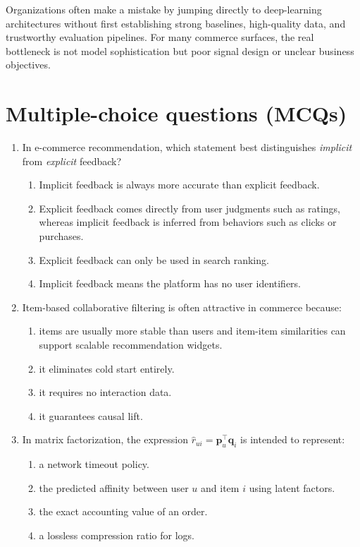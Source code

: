 Organizations often make a mistake by jumping directly to deep-learning architectures without first establishing strong baselines, high-quality data, and trustworthy evaluation pipelines.
For many commerce surfaces, the real bottleneck is not model sophistication but poor signal design or unclear business objectives.

\section{Multiple-choice questions (MCQs)}
\begin{enumerate}
  \item In e-commerce recommendation, which statement best distinguishes \emph{implicit} from \emph{explicit} feedback?
  \begin{enumerate}
    \item Implicit feedback is always more accurate than explicit feedback.
    \item Explicit feedback comes directly from user judgments such as ratings, whereas implicit feedback is inferred from behaviors such as clicks or purchases.
    \item Explicit feedback can only be used in search ranking.
    \item Implicit feedback means the platform has no user identifiers.
  \end{enumerate}

  \item Item-based collaborative filtering is often attractive in commerce because:
  \begin{enumerate}
    \item items are usually more stable than users and item-item similarities can support scalable recommendation widgets.
    \item it eliminates cold start entirely.
    \item it requires no interaction data.
    \item it guarantees causal lift.
  \end{enumerate}

  \item In matrix factorization, the expression $\hat{r}_{ui}=\mathbf{p}_u^\top \mathbf{q}_i$ is intended to represent:
  \begin{enumerate}
    \item a network timeout policy.
    \item the predicted affinity between user $u$ and item $i$ using latent factors.
    \item the exact accounting value of an order.
    \item a lossless compression ratio for logs.
  \end{enumerate}


\end{enumerate}
